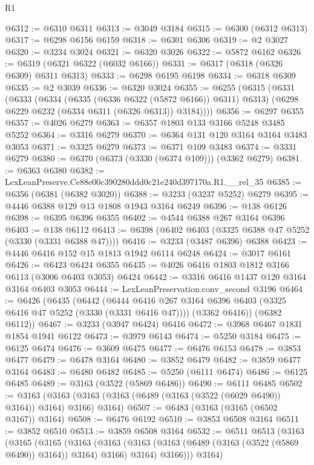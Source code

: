 \begin{lexlean}{R1}
\begin{coremodule}
@6312 := @6310 @6311
@6313 := @3049 @3184
@6315 := @6300 (@6312 @6313)
@6317 := @6298 @6156 @6159
@6318 := @6301 @6306
@6319 := @2 @3027
@6320 := @3234 @3024
@6321 := @6320 @3026
@6322 := @5872 @6162
@6326 := @6319 (@6321 @6322 (@6032 @6166))
@6331 := @6317 (@6318 (@6326 @6309) @6311 @6313)
@6333 := @6298 @6195 @6198
@6334 := @6318 @6309
@6335 := @2 @3039
@6336 := @6320 @3024
@6355 := @6255
    (@6315
      (@6331
        (@6333
          (@6334 (@6335 (@6336 @6322 (@5872 @6166)) @6311) @6313)
          (@6298 @6229 @6232 (@6334 @6311 (@6326 @6313)) @3184))))
@6356 := @6297 @6355
@6357 := @4026 @6279
@6363 := @6357 @1803 @133 @3166 @5248 @3485 @5252
@6364 := @3316 @6279
@6370 := @6364 @131 @120 @3164 @3164 @3483 @3053
@6371 := @3325 @6279
@6373 := @6371 @109 @3483
@6374 := @3331 @6279
@6380 := @6370 (@6373 (@3330 (@6374 @109))) (@3362 @6279)
@6381 := @6363 @6380
@6382 := LexLeanPreserve.Ce88e00c390280ddd0c21e240d397170a.R1.__rel_35
@6385 := @6356 (@6381 (@6382 @3020))
@6388 := @3233 (@3237 @5252) @6279
@6395 := @4446 @6388 @129 @13 @1808 @1943 @3164 @6249
@6396 := @138 @6126
@6398 := @6395 @6396 @6355
@6402 := @4544 @6388 @267 @3164 @6396
@6403 := @138 @6112
@6413 := @6398 (@6402 @6403 (@3325 @6388 @47 @5252 (@3330 (@3331 @6388 @47))))
@6416 := @3233 (@3487 @6396) @6388
@6423 := @4446 @6416 @152 @15 @1813 @1942 @6114 @6248
@6424 := @3017 @6161
@6426 := @6423 @6424 @6355
@6435 := @4026 @6416 @1803 @1812 @3166 @6113 (@3006 @6403 @3053) @6424
@6442 := @3316 @6416 @1437 @120 @3164 @3164 @6403 @3053
@6444 := LexLeanPreservation.conv_second @3196
@6464 := @6426
    (@6435
      (@6442
        (@6444 @6416 @267 @3164 @6396 @6403 (@3325 @6416 @47 @5252 (@3330 (@3331 @6416 @47))))
        (@3362 @6416))
      (@6382 @6112))
@6467 := @3233 (@3947 @6424) @6416
@6472 := @3968 @6467 @1831 @1854 @1941 @6122
@6473 := @3979 @6143
@6474 := @5250 @3184
@6475 := @6125 @6474
@6476 := @3609 @6475
@6477 := @6476 @6153
@6478 := @3853 @6477
@6479 := @6478 @3164
@6480 := @3852 @6479
@6482 := @3859 @6477 @3164
@6483 := @6480 @6482
@6485 := @5250 (@6111 @6474)
@6486 := @6125 @6485
@6489 := @3163 (@3522 (@5869 @6486))
@6490 := @6111 @6485
@6502 := @3163 (@3163 (@3163 (@3163 (@6489 (@3163 (@3522 (@6029 @6490)) @3164)) @3164) @3166) @3164)
@6507 := @6483 (@3163 (@3165 (@6502 @3167)) @3164)
@6508 := @6476 @6192
@6510 := @3853 @6508 @3164
@6511 := @3852 @6510
@6513 := @3859 @6508 @3164
@6532 := @6511
    @6513
    (@3163
      (@3165
        (@3165
          (@3163
            (@3163 (@3163 (@3163 (@6489 (@3163 (@3522 (@5869 @6490)) @3164)) @3164) @3166) @3164)
            @3166)))
      @3164)

\end{coremodule}
\end{lexlean}
